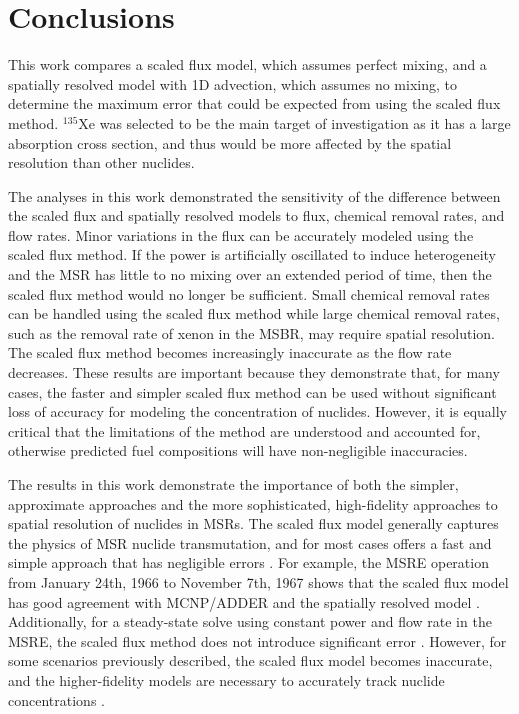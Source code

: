 \documentclass{style/nseJournal}
\begin{document}
\section{Conclusions}

This work compares a scaled flux model, which assumes perfect mixing, and a spatially resolved model with 1D advection, which assumes no mixing, to determine the maximum error that could be expected from using the scaled flux method.
$^{135}$Xe was selected to be the main target of investigation as it has a large absorption cross section, and thus would be more affected by the spatial resolution than other nuclides.

The analyses in this work demonstrated the sensitivity of the difference between the scaled flux and spatially resolved models to flux, chemical removal rates, and flow rates.
Minor variations in the flux can be accurately modeled using the scaled flux method.
If the power is artificially oscillated to induce heterogeneity and the MSR has little to no mixing over an extended period of time, then the scaled flux method would no longer be sufficient.
Small chemical removal rates can be handled using the scaled flux method while large chemical removal rates, such as the removal rate of xenon in the MSBR, may require spatial resolution.
The scaled flux method becomes increasingly inaccurate as the flow rate decreases.
These results are important because they demonstrate that, for many cases, the faster and simpler scaled flux method can be used without significant loss of accuracy for modeling the concentration of nuclides.
However, it is equally critical that the limitations of the method are understood and accounted for, otherwise predicted fuel compositions will have non-negligible inaccuracies.

The results in this work demonstrate the importance of both the simpler, approximate approaches and the more sophisticated, high-fidelity approaches to spatial resolution of nuclides in MSRs.
The scaled flux model generally captures the physics of MSR nuclide transmutation, and for most cases offers a fast and simple approach that has negligible errors \cite{betzler2021liquid}.
For example, the MSRE operation from January 24th, 1966 to November 7th, 1967 shows that the scaled flux model has good agreement with MCNP/ADDER and the spatially resolved model \cite{anderson_user_2022}.
Additionally, for a steady-state solve using constant power and flow rate in the MSRE, the scaled flux method does not introduce significant error \cite{shahbazi_steady-state_2022}.
However, for some scenarios previously described, the scaled flux model becomes inaccurate, and the higher-fidelity models are necessary to accurately track nuclide concentrations \cite{tanocoupled2023}.
\end{document}

